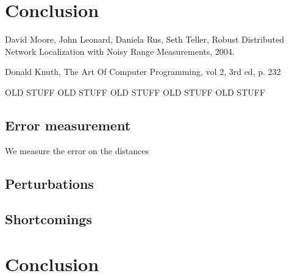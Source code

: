 \documentclass[letterpaper, 10 pt, conference]{ieeeconf}  %
\begin{document}
\section{Conclusion}


\begin{thebibliography}{99}

 David Moore, John Leonard, Daniela Rus, Seth Teller, Robust Distributed Network Localization with Noisy Range Measurements, 2004.

 Donald Knuth, The Art Of Computer Programming, vol 2, 3rd ed, p. 232





\end{thebibliography}









OLD STUFF
OLD STUFF
OLD STUFF
OLD STUFF
OLD STUFF














\subsection{Error measurement}
We measure the error on the distances 




\subsection{Perturbations}

\subsection{Shortcomings}
%

\section{Conclusion}
\end{document}
